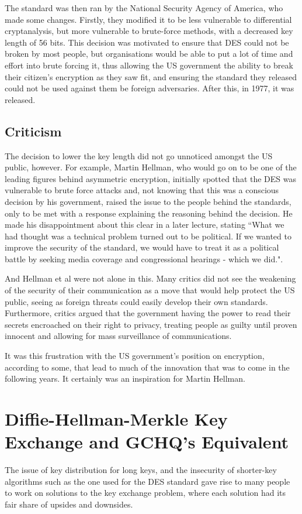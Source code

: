 \documentclass[a4paper,12pt]{report}
\begin{document}
The standard was then ran by the National Security Agency of America, who made
some changes. Firstly, they modified it to be less vulnerable to differential
cryptanalysis, but more vulnerable to brute-force methods, with a decreased key
length of 56 bits\cite{schneier}. This decision was motivated to ensure that
DES could not be broken by most people, but organisations would be able to put a
lot of time and effort into brute forcing it, thus allowing the US government
the ability to break their citizen's encryption as they saw fit, and ensuring
the standard they released could not be used against them be foreign
adversaries. After this, in 1977, it was released.
    \subsection{Criticism}
The decision to lower the key length did not go unnoticed amongst the US
public, however. For example, Martin Hellman, who would go on to be one of the
leading figures behind asymmetric encryption, initially spotted that the DES was
vulnerable to brute force attacks and, not knowing that this was a conscious
decision by his government, raised the issue to the people behind the standards,
only to be met with a response explaining the reasoning behind the decision. He
made his disappointment about this clear in a later lecture, stating ``What we
had thought was a technical problem turned out to be political. If we wanted to
improve the security of the standard, we would have to treat it as a political
battle by seeking media coverage and congressional hearings - which we
did."\cite{hellman}.

And Hellman et al were not alone in this. Many critics did not see the weakening
of the security of their communication as a move that would help protect the US
public, seeing as foreign threats could easily develop their own standards.
Furthermore, critics argued that the government having the power to read their
secrets encroached on their right to privacy, treating people as guilty until
proven innocent and allowing for mass surveillance of communications.

It was this frustration with the US government's position on encryption,
according to some\cite{schneier}, that lead to much of the innovation that was
to come in the following years. It certainly was an inspiration for Martin
Hellman\cite{hellman}.

  \section{Diffie-Hellman-Merkle Key Exchange and GCHQ's Equivalent}
The issue of key distribution for long keys, and the insecurity of shorter-key
algorithms such as the one used for the DES standard gave rise to many people to
work on solutions to the key exchange problem, where each solution had its fair
share of upsides and downsides.
\end{document}
